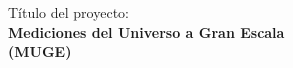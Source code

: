 \section*{}
\begin{center}
{\LARGE T\'itulo del proyecto: \\ {\bf Mediciones del Universo a Gran Escala}\\{\bf (MUGE)}}
\end{center}
